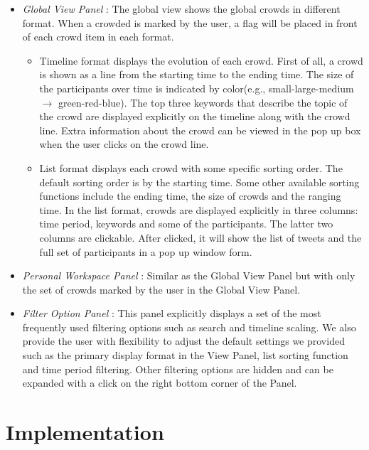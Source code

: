 \documentclass{sig-alternate}
\begin{document}
\begin{itemize}
    \item \textit{Global View Panel} : The global view shows the global crowds
    in different format. When a crowded is marked by the user, a flag will be
    placed in front of each crowd item in each format.

    \begin{itemize}
        \item Timeline format displays the evolution of each crowd.
        First of all, a crowd is shown as a line from the starting time
        to the ending time. The size of the participants over time is
        indicated by color(e.g., small-large-medium $\longrightarrow$
        green-red-blue). The top three keywords that describe the topic of
        the crowd are displayed explicitly on the timeline along with
        the crowd line. Extra information about the crowd can be viewed
        in the pop up box when the user clicks on the crowd line.
        \item List format displays each crowd with some specific
        sorting order. The default sorting order is by the starting
        time. Some other available sorting functions include the
        ending time, the size of crowds and the ranging time. In the
        list format, crowds are displayed explicitly in three columns:
        time period, keywords and some of the participants. The latter
        two columns are clickable. After clicked, it will show the list
        of tweets and the full set of participants in a pop up window
        form.
    \end{itemize}

    \item \textit{Personal Workspace Panel} : Similar as the Global View Panel
    but with only the set of crowds marked by the user in the Global View
    Panel.
    \item \textit{Filter Option Panel} : This panel explicitly displays a set of
    the most frequently used filtering options such as search and timeline scaling.
    We also provide the user with flexibility to adjust the default
    settings we provided such as the primary display format in the View
    Panel, list sorting function and time period filtering. Other filtering
    options are hidden and can be expanded with a click on the right bottom corner
    of the Panel.
\end{itemize}

\section{Implementation}
\end{document}
